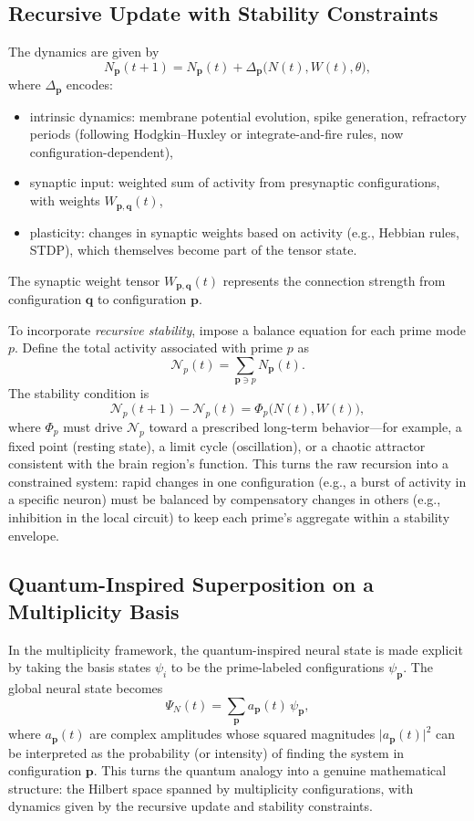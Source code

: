 \documentclass[11pt]{article}
\begin{document}
\subsection{Recursive Update with Stability Constraints}
The dynamics are given by
\[
N_{\mathbf{p}}(t+1)
=
N_{\mathbf{p}}(t)
+
\Delta_{\mathbf{p}}\big(N(t), W(t), \theta\big),
\]
where $\Delta_{\mathbf{p}}$ encodes:
\begin{itemize}
    \item intrinsic dynamics: membrane potential evolution, spike generation, refractory periods (following Hodgkin--Huxley or integrate-and-fire rules, now configuration-dependent),
    \item synaptic input: weighted sum of activity from presynaptic configurations, with weights $W_{\mathbf{p},\mathbf{q}}(t)$,
    \item plasticity: changes in synaptic weights based on activity (e.g., Hebbian rules, STDP), which themselves become part of the tensor state.
\end{itemize}
The synaptic weight tensor $W_{\mathbf{p},\mathbf{q}}(t)$ represents the connection strength from configuration $\mathbf{q}$ to configuration $\mathbf{p}$.

To incorporate \emph{recursive stability}, impose a balance equation for each prime mode $p$. Define the total activity associated with prime $p$ as
\[
\mathcal{N}_p(t)
=
\sum_{\mathbf{p} \ni p} N_{\mathbf{p}}(t).
\]
The stability condition is
\[
\mathcal{N}_p(t+1) - \mathcal{N}_p(t)
=
\Phi_p\big(N(t), W(t)\big),
\]
where $\Phi_p$ must drive $\mathcal{N}_p$ toward a prescribed long-term behavior---for example, a fixed point (resting state), a limit cycle (oscillation), or a chaotic attractor consistent with the brain region's function. This turns the raw recursion into a constrained system: rapid changes in one configuration (e.g., a burst of activity in a specific neuron) must be balanced by compensatory changes in others (e.g., inhibition in the local circuit) to keep each prime's aggregate within a stability envelope.

\subsection{Quantum-Inspired Superposition on a Multiplicity Basis}
In the multiplicity framework, the quantum-inspired neural state is made explicit by taking the basis states $\psi_i$ to be the prime-labeled configurations $\psi_{\mathbf{p}}$. The global neural state becomes
\[
\Psi_N(t)
=
\sum_{\mathbf{p}} a_{\mathbf{p}}(t)\,\psi_{\mathbf{p}},
\]
where $a_{\mathbf{p}}(t)$ are complex amplitudes whose squared magnitudes $\lvert a_{\mathbf{p}}(t)\rvert^2$ can be interpreted as the probability (or intensity) of finding the system in configuration $\mathbf{p}$. This turns the quantum analogy into a genuine mathematical structure: the Hilbert space spanned by multiplicity configurations, with dynamics given by the recursive update and stability constraints.
\end{document}
